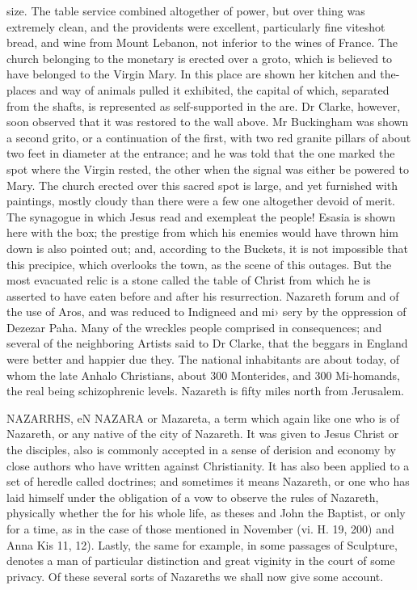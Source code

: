 size. The table service combined altogether of power, but over thing was extremely clean, and the providents were excellent, particularly fine viteshot bread, and wine from Mount Lebanon, not inferior to the wines of France. The church belonging to the monetary is erected over a groto, which is believed to have belonged to the Virgin Mary. In this place are shown her kitchen and the-places and way of animals pulled it exhibited, the capital of which, separated from the shafts, is represented as self-supported in the are. Dr Clarke, however, soon observed that it was restored to the wall above. Mr Buckingham was shown a second grito, or a continuation of the first, with two red granite pillars of about two feet in diameter at the entrance; and he was told that the one marked the spot where the Virgin rested, the other when the signal was either be powered to Mary. The church erected over this sacred spot is large, and yet furnished with paintings, mostly cloudy than there were a few one altogether devoid of merit. The synagogue in which Jesus read and exempleat the people! Esasia is shown here with the box; the prestige from which his enemies would have thrown him down is also pointed out; and, according to the Buckets, it is not impossible that this precipice, which overlooks the town, as the scene of this outages. But the most evacuated relic is a stone called the table of Christ from which he is asserted to have eaten before and after his resurrection. Nazareth forum and of the use of Aros, and was reduced to Indigneed and mi› sery by the oppression of Dezezar Paha. Many of the wreckles people comprised in consequences; and several of the neighboring Artists said to Dr Clarke, that the beggars in England were better and happier due they. The national inhabitants are about today, of whom the late Anhalo Christians, about 300 Monterides, and 300 Mi-homands, the real being schizophrenic levels. Nazareth is fifty miles north from Jerusalem.\par\medskip
NAZARRHS, eN NAZARA or Mazareta, a term which again like one who is of Nazareth, or any native of the city of Nazareth. It was given to Jesus Christ or the disciples, also is commonly accepted in a sense of derision and economy by close authors who have written against Christianity. It has also been applied to a set of heredle called doctrines; and sometimes it means Nazareth, or one who has laid himself under the obligation of a vow to observe the rules of Nazareth, physically whether the for his whole life, as theses and John the Baptist, or only for a time, as in the case of those mentioned in November (vi. H. 19, 200) and Anna Kis 11, 12). Lastly, the same for example, in some passages of Sculpture, denotes a man of particular distinction and great viginity in the court of some privacy. Of these several sorts of Nazareths we shall now give some account.\par\medskip
